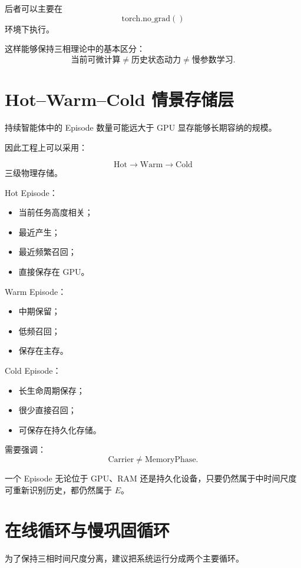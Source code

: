 后者可以主要在
\[
\mathrm{torch.no\_grad()}
\]
环境下执行。

这样能够保持三相理论中的基本区分：
\[
\boxed{
\text{当前可微计算}
\neq
\text{历史状态动力}
\neq
\text{慢参数学习}.
}
\]

\section{Hot--Warm--Cold 情景存储层}

持续智能体中的 Episode 数量可能远大于 GPU 显存能够长期容纳的规模。

因此工程上可以采用：

\[
\boxed{
\mathrm{Hot}
\rightarrow
\mathrm{Warm}
\rightarrow
\mathrm{Cold}
}
\]
三级物理存储。

Hot Episode：

\begin{itemize}
    \item 当前任务高度相关；
    \item 最近产生；
    \item 最近频繁召回；
    \item 直接保存在 GPU。
\end{itemize}

Warm Episode：

\begin{itemize}
    \item 中期保留；
    \item 低频召回；
    \item 保存在主存。
\end{itemize}

Cold Episode：

\begin{itemize}
    \item 长生命周期保存；
    \item 很少直接召回；
    \item 可保存在持久化存储。
\end{itemize}

需要强调：
\[
\boxed{
\mathrm{Carrier}
\neq
\mathrm{MemoryPhase}.
}
\]

一个 Episode 无论位于 GPU、RAM 还是持久化设备，只要仍然属于中时间尺度可重新识别历史，都仍然属于 $E$。

\section{在线循环与慢巩固循环}

为了保持三相时间尺度分离，建议把系统运行分成两个主要循环。

